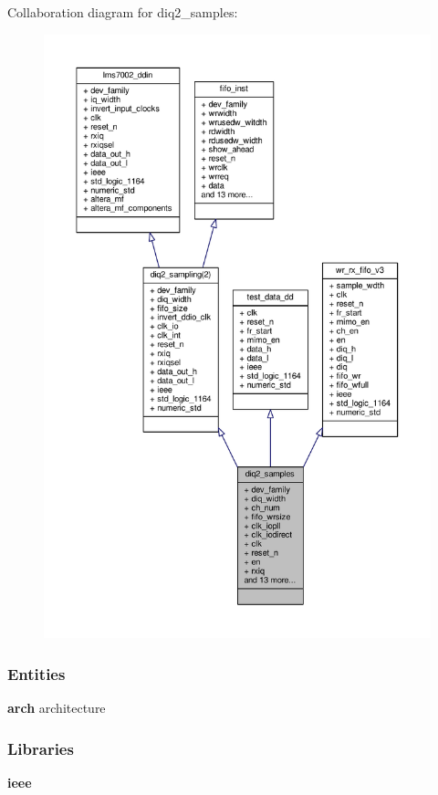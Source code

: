 Collaboration diagram for diq2\+\_\+samples\+:\nopagebreak
\begin{figure}[H]
\begin{center}
\leavevmode
\includegraphics[width=350pt]{da/d88/classdiq2__samples__coll__graph}
\end{center}
\end{figure}
\subsubsection*{Entities}
\begin{DoxyCompactItemize}
\item 
{\bf arch} architecture
\end{DoxyCompactItemize}
\subsubsection*{Libraries}
 \begin{DoxyCompactItemize}
\item 
{\bf ieee} 
\end{DoxyCompactItemize}
